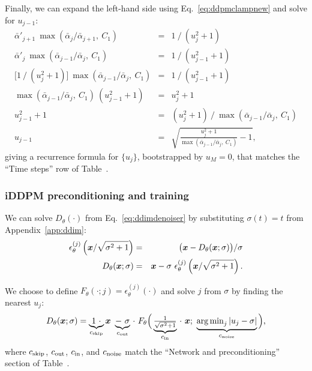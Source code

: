 Finally, we can expand the left-hand side using Eq.~\ref{eq:ddpmclampnew} and solve for $u_{j-1}$:
\begin{eqnarray}
  \bar\alpha'_{j+1} ~\max(\bar\alpha_j / \bar\alpha_{j+1}, ~C_1) &=& 1 ~/~ (u_j^2 + 1) \\
  \bar\alpha'_j ~\max(\bar\alpha_{j-1} / \bar\alpha_j, ~C_1) &=& 1 ~/~ (u_{j-1}^2 + 1) \\
  \big[ 1 ~/~ (u_j^2 + 1) \big] ~\max(\bar\alpha_{j-1} / \bar\alpha_j, ~C_1) &=& 1 ~/~ (u_{j-1}^2 + 1) \\
  \max(\bar\alpha_{j-1} / \bar\alpha_j, ~C_1) ~(u_{j-1}^2 + 1) &=& u_j^2 + 1 \\
  u_{j-1}^2 + 1 &=& (u_j^2 + 1) ~/~ \max(\bar\alpha_{j-1} / \bar\alpha_j, ~C_1) \\
  u_{j-1} &=& \sqrt{\frac{u_j^2 + 1}{\max(\bar\alpha_{j-1} / \bar\alpha_j, ~C_1)} - 1}
  \text{,}
\end{eqnarray}
giving a recurrence formula for $\{u_j\}$, bootstrapped by $u_M = 0$, that matches the ``Time steps'' row of Table~.

\subsubsection{iDDPM preconditioning and training}

We can solve $D_\theta(\cdot)$ from Eq.~\ref{eq:ddimdenoiser} by substituting $\sigma(t) = t$ from Appendix~\ref{app:ddim}:
\begin{eqnarray}
  \epsilon_\theta^{(j)} \left( \boldsymbol{x} / \sqrt{\sigma^2 + 1} \right) &=& \big( \boldsymbol{x} - D_\theta(\boldsymbol{x}; \sigma) \big) / \sigma \\
  D_\theta(\boldsymbol{x}; \sigma) &=& \boldsymbol{x} - \sigma ~\epsilon_\theta^{(j)} \left( \boldsymbol{x} / \sqrt{\sigma^2 + 1} \right)
  \text{.}
\end{eqnarray}

We choose to define $F_\theta(\cdot; j) = \epsilon_\theta^{(j)}(\cdot)$ and solve $j$ from $\sigma$ by finding the nearest $u_j$:
\begin{equation}
  D_\theta(\boldsymbol{x}; \sigma) = \underbrace{1~\cdot}_{c_\text{skip}} \boldsymbol{x} ~\underbrace{-~\sigma}_{c_\text{out}} \,\cdot ~F_\theta\Big( \underbrace{\tfrac{1}{\sqrt{\sigma^2 + 1}}}_{c_\text{in}} \,\cdot~\boldsymbol{x}; ~\underbrace{\operatorname{arg\,min}_j |u_j - \sigma|}_{c_\text{noise}} \Big)
  \label{eq:iddpmprecond}
  \text{,}
\end{equation}
where $c_\text{skip}$, $c_\text{out}$, $c_\text{in}$, and $c_\text{noise}$ match the ``Network and preconditioning'' section of Table~.

